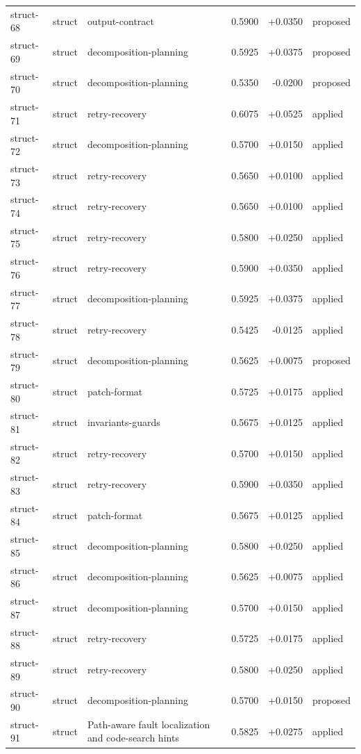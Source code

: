 \begin{center}
\begin{longtable}{llp{5.2cm}rrl}
struct-68 & struct & output-contract & 0.5900 & +0.0350 & proposed \\
struct-69 & struct & decomposition-planning & 0.5925 & +0.0375 & proposed \\
struct-70 & struct & decomposition-planning & 0.5350 & -0.0200 & proposed \\
struct-71 & struct & retry-recovery & 0.6075 & +0.0525 & applied \\
struct-72 & struct & decomposition-planning & 0.5700 & +0.0150 & applied \\
struct-73 & struct & retry-recovery & 0.5650 & +0.0100 & applied \\
struct-74 & struct & retry-recovery & 0.5650 & +0.0100 & applied \\
struct-75 & struct & retry-recovery & 0.5800 & +0.0250 & applied \\
struct-76 & struct & retry-recovery & 0.5900 & +0.0350 & applied \\
struct-77 & struct & decomposition-planning & 0.5925 & +0.0375 & applied \\
struct-78 & struct & retry-recovery & 0.5425 & -0.0125 & applied \\
struct-79 & struct & decomposition-planning & 0.5625 & +0.0075 & proposed \\
struct-80 & struct & patch-format & 0.5725 & +0.0175 & applied \\
struct-81 & struct & invariants-guards & 0.5675 & +0.0125 & applied \\
struct-82 & struct & retry-recovery & 0.5700 & +0.0150 & applied \\
struct-83 & struct & retry-recovery & 0.5900 & +0.0350 & applied \\
struct-84 & struct & patch-format & 0.5675 & +0.0125 & applied \\
struct-85 & struct & decomposition-planning & 0.5800 & +0.0250 & applied \\
struct-86 & struct & decomposition-planning & 0.5625 & +0.0075 & applied \\
struct-87 & struct & decomposition-planning & 0.5700 & +0.0150 & applied \\
struct-88 & struct & retry-recovery & 0.5725 & +0.0175 & applied \\
struct-89 & struct & retry-recovery & 0.5800 & +0.0250 & applied \\
struct-90 & struct & decomposition-planning & 0.5700 & +0.0150 & proposed \\
struct-91 & struct & Path-aware fault localization and code-search hints & 0.5825 & +0.0275 & applied \\

\end{longtable}
\end{center}
